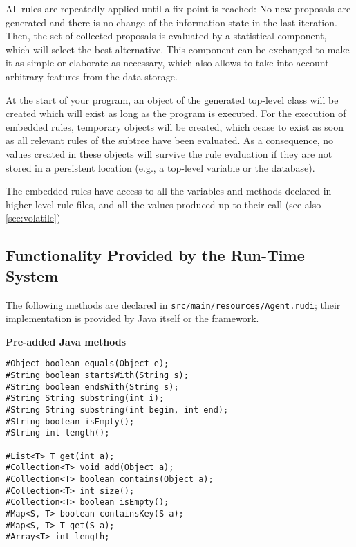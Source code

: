 All rules are repeatedly applied until a fix point is reached: No new proposals
are generated and there is no change of the information state in the last
iteration. Then, the set of collected proposals is evaluated by a statistical
component, which will select the best alternative. This component can be
exchanged to make it as simple or elaborate as necessary, which also allows to
take into account arbitrary features from the data storage.

At the start of your program, an object of the generated top-level
class will be created which will exist as long as the program is
executed. For the execution of embedded rules, temporary objects will
be created, which cease to exist as soon as all relevant rules of the
subtree have been evaluated. As a consequence, no values created in
these objects will survive the rule evaluation if they are not stored
in a persistent location (e.g., a top-level variable or the database).

The embedded rules have access to all the variables and methods
declared in higher-level rule files, and all the values produced up to
their call (see also \ref{sec:volatile})

\subsection{Functionality Provided by the Run-Time System}
The following methods are declared in \texttt{src/main/resources/Agent.rudi};
their implementation is provided by Java itself or the \vonda framework.

\vspace*{2ex}

\newcommand{\pgr}[1]{\noindent\textbf{#1}}

\pgr{Pre-added Java methods}
\begin{small}
\begin{lstlisting}
#Object boolean equals(Object e);
#String boolean startsWith(String s);
#String boolean endsWith(String s);
#String String substring(int i);
#String String substring(int begin, int end);
#String boolean isEmpty();
#String int length();

#List<T> T get(int a);
#Collection<T> void add(Object a);
#Collection<T> boolean contains(Object a);
#Collection<T> int size();
#Collection<T> boolean isEmpty();
#Map<S, T> boolean containsKey(S a);
#Map<S, T> T get(S a);
#Array<T> int length;
\end{lstlisting}
\end{small}

